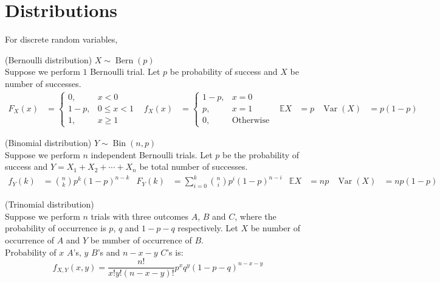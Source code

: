 \documentclass{huhtakm-template-book}
\newcommand{\expect}{\mathbb{E}}
\DeclareMathOperator{\Bern}{Bern}
\DeclareMathOperator{\Bin}{Bin}
\DeclareMathOperator{\Var}{Var}
\begin{document}
\newpage
\section*{Distributions}
For discrete random variables,
\begin{seg}(Bernoulli distribution) $X\sim\Bern(p)$\\
    Suppose we perform $1$ Bernoulli trial. Let $p$ be probability of success and $X$ be number of successes.
    \begin{align*}
        F_{X}(x)&=\begin{cases}
            0, &x<0\\
            1-p, &0\leq x<1\\
            1, &x\geq 1
        \end{cases} & f_{X}(x)&=\begin{cases}
            1-p, &x=0\\
            p, &x=1\\
            0, &\text{Otherwise}
        \end{cases} & \expect X&=p & \Var(X)&=p(1-p)
    \end{align*}
\end{seg}
\begin{seg}(Binomial distribution) $Y\sim\Bin(n,p)$\\
    Suppose we perform $n$ independent Bernoulli trials. Let $p$ be the probability of success and $Y=X_{1}+X_{2}+\cdots+X_{n}$ be total number of successes.
    \begin{align*}
        f_{Y}(k)&=\binom{n}{k}p^{k}(1-p)^{n-k} & F_{Y}(k)&=\sum_{i=0}^{k}\binom{n}{i}p^{i}(1-p)^{n-i} & \expect X&=np & \Var(X)&=np(1-p)
    \end{align*}
\end{seg}
\begin{seg}(Trinomial distribution)\\
    Suppose we perform $n$ trials with three outcomes $A$, $B$ and $C$, where the probability of occurrence is $p$, $q$ and $1-p-q$ respectively. Let $X$ be number of occurrence of $A$ and $Y$ be number of occurrence of $B$.\\
    Probability of $x$ $A$'s, $y$ $B$'s and $n-x-y$ $C$'s is:
    \begin{equation*}
        f_{X,Y}(x,y)=\frac{n!}{x!y!(n-x-y)!}p^{x}q^{y}(1-p-q)^{n-x-y}
    \end{equation*}
\end{seg}
\end{document}
